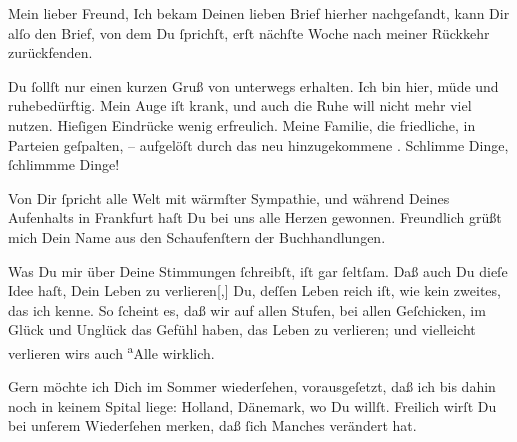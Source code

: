 \pstart\center{}Mein lieber Freund,\pend\vspace{0.5em}
\pstart
           Ich bekam Deinen lieben Brief hierher nachgeſandt, kann Dir alſo den Brief, von dem
               Du ſprichſt, erſt nächſte Woche nach meiner Rückkehr zurückfenden.\pend
           
\pstart
           Du ſollſt nur einen kurzen Gruß von unterwegs erhalten. Ich bin hier, müde und
               ruhebedürftig. Mein  Auge iſt krank, und  auch die Ruhe will nicht mehr viel nutzen. Hieſigen
               Eindrücke wenig erfreulich. Meine Familie, die {\pb}friedliche, in  Parteien geſpalten, – aufgelöſt durch das neu hinzugekommene \label{K_L02771-1v}\label{K_L02771-1}.
               Schlimme Dinge, ſchlimmme Dinge! \pend
           
\pstart
           Von Dir ſpricht alle Welt mit wärmſter Sympathie, und während Deines Aufenhalts in
                  Frankfurt haſt Du bei uns alle Herzen
               gewonnen. Freundlich grüßt mich Dein Name aus den Schaufenſtern der
               Buchhandlungen.\pend
           
\pstart
           Was Du mir über Deine Stimmungen ſchreibſt, iſt gar ſeltſam. Daß auch Du dieſe Idee
               haſt, Dein Leben zu verlieren{[},{]}{ }{\pb}Du, deſſen Leben reich iſt, wie kein zweites, das
               ich kenne. So ſcheint es, daß \strikeout{\textcolor{gray}{×}} wir auf allen Stufen, bei allen Geſchicken, im Glück und Unglück das Gefühl
               haben, das Leben zu verlieren; und vielleicht verlieren wirs auch \substVorne{}\textsuperscript{a}\substDazwischen{}A\substHinten{}lle wirklich.\pend
           
\pstart
           Gern möchte ich Dich im Sommer wiederſehen, vorausgeſetzt, daß ich bis dahin noch in
               keinem Spital liege: Holland, Dänemark, wo Du willſt. Freilich wirſt Du bei unſerem
               Wiederſehen {\pb}merken, daß ſich Manches verändert
               hat.\pend
           
